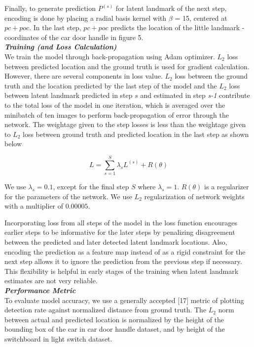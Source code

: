 \documentclass [11pt,letterpaper ,twoside ,openany ]{report}
\begin{document}
    \noindent
    Finally, to generate prediction \(P^{(s)} \) for latent landmark of the next step, encoding is done by placing a radial basis kernel with \(\beta \) = 15, centered at \( pc + poc \). In the last step, \( pc  + poc \) predicts the location of the little landmark - coordinates of the car door handle in figure 5.\\

    \noindent
    \textbf{\textit{Training (and Loss Calculation)}}\\
    We train the model through back-propagation using Adam optimizer. \(L_2\) loss between predicted location and the ground truth is used for gradient calculation. However, there are several components in loss value. \(L_2\) loss between the ground truth and the location predicted by the last step of the model and the \(L_2\) loss between latent landmark predicted in step \(s\) and estimated in step \textit {s-1} contribute to the total loss of the model in one iteration, which is averaged over the minibatch of ten images to perform back-propagation of error through the network. The weightage given to the step losses is less than the weightage given to \(L_2\) loss between ground truth and predicted location in the last step as shown below

    \[ L =  \displaystyle\sum_{s=1}^{S} \lambda _s L^{(s)} + R(\theta)\]

    \noindent
    We use \( \lambda _s = 0.1 \), except for the final step \(S\) where \( \lambda _s = 1\).  \( R(\theta) \) is a regularizer for the parameters of the network. We use \(L_2\) regularization of network weights with a multiplier of \(0.00005\). 
        
    Incorporating loss from all steps of the model in the loss function encourages earlier steps to be informative for the later steps by penalizing disagreement between the predicted and later detected latent landmark locations. Also, encoding the prediction as a feature map instead of as a rigid constraint for the next step allows it to ignore the prediction from the previous step if necessary. This flexibility is helpful in early stages of the training when latent landmark estimates are not very reliable.\\

    \noindent
    \textbf{\textit{Performance Metric}}\\
    To evaluate model accuracy, we use a generally accepted [17] metric of plotting detection rate against normalized distance from ground truth. The \(L_2\) norm between actual and predicted location is normalized by the height of the bounding box of the car in car door handle dataset,  and  by height of the switchboard in light switch dataset.\\
\end{document}
